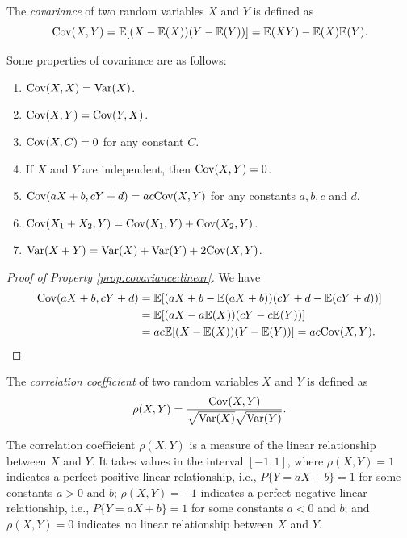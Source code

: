 \begin{definition}[Covariance]
  The \emph{covariance} of two random variables \(X\) and \(Y\) is defined as
  \[
    \mathrm{Cov}(X, Y) = \mathbb{E}[(X - \mathbb{E}(X))(Y - \mathbb{E}(Y))] = \mathbb{E}(XY) - \mathbb{E}(X) \mathbb{E}(Y).
  \]
\end{definition}

\begin{proposition}
  Some properties of covariance are as follows:
  \begin{enumerate}
    \item \(\mathrm{Cov}(X, X) = \mathrm{Var}(X)\).
    \item \(\mathrm{Cov}(X, Y) = \mathrm{Cov}(Y, X)\).
    \item \(\mathrm{Cov}(X, C) = 0\) for any constant \(C\).
    \item If \(X\) and \(Y\) are independent, then \(\mathrm{Cov}(X, Y) = 0\).
    \item\label{prop:covariance:linear} \(\mathrm{Cov}(aX + b, cY + d) = ac \mathrm{Cov}(X, Y)\) for any constants \(a, b, c\) and \(d\).
    \item \(\mathrm{Cov}(X_1 + X_2, Y) = \mathrm{Cov}(X_1, Y) + \mathrm{Cov}(X_2, Y)\).
    \item \(\mathrm{Var}(X + Y) = \mathrm{Var}(X) + \mathrm{Var}(Y) + 2 \mathrm{Cov}(X, Y)\).
  \end{enumerate}
\end{proposition}

\begin{proof}[Proof of Property \ref{prop:covariance:linear}]
  We have
  \begin{align*}
    \mathrm{Cov}(aX + b, cY + d) &= \mathbb{E}[(aX + b - \mathbb{E}(aX + b))(cY + d - \mathbb{E}(cY + d))] \\
    &= \mathbb{E}[(aX - a\mathbb{E}(X))(cY - c\mathbb{E}(Y))] \\
    &= ac \mathbb{E}[(X - \mathbb{E}(X))(Y - \mathbb{E}(Y))] = ac \mathrm{Cov}(X, Y). \qedhere
  \end{align*}
\end{proof}

\begin{definition}
  The \emph{correlation coefficient} of two random variables \(X\) and \(Y\) is defined as
  \[
    \rho(X, Y) = \frac{\mathrm{Cov}(X, Y)}{\sqrt{\mathrm{Var}(X)} \sqrt{\mathrm{Var}(Y)}}.
  \]
\end{definition}

The correlation coefficient \(\rho(X, Y)\) is a measure of the linear relationship between \(X\) and \(Y\). It takes values in the interval \([-1, 1]\), where \(\rho(X, Y) = 1\) indicates a perfect positive linear relationship, i.e., $P\{Y = aX + b\} = 1$ for some constants \(a > 0\) and \(b\); \(\rho(X, Y) = -1\) indicates a perfect negative linear relationship, i.e., $P\{Y = aX + b\} = 1$ for some constants \(a < 0\) and \(b\); and \(\rho(X, Y) = 0\) indicates no linear relationship between \(X\) and \(Y\).

